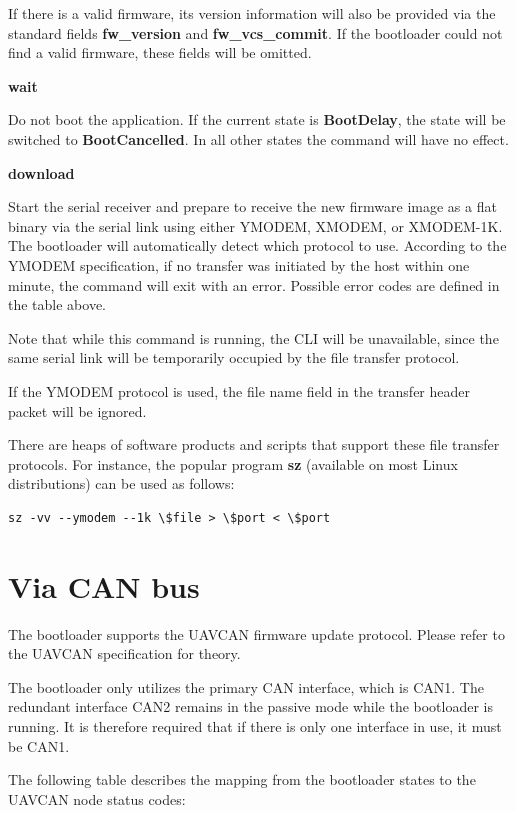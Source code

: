 \documentclass{zubaxdoc}
\begin{document}
If there is a valid firmware, its version information will also be provided via the standard fields \textbf{fw{\_}version} and  \textbf{fw{\_}vcs{\_}commit}. If the bootloader could not find a valid firmware, these fields will be omitted.

\textbf{wait}

Do not boot the application. If the current state is \textbf{BootDelay}, the state will be switched to \textbf{BootCancelled}. In all other states the command will have no effect.

\textbf{download}

Start the serial receiver and prepare to receive the new firmware image as a flat binary via the serial link using either YMODEM, XMODEM, or XMODEM-1K. The bootloader will automatically detect which protocol to use. According to the YMODEM specification, if no transfer was initiated by the host within one minute, the command will exit with an error. Possible error codes are defined in the table above.

Note that while this command is running, the CLI will be unavailable, since the same serial link will be temporarily occupied by the file transfer protocol.

If the YMODEM protocol is used, the file name field in the transfer header packet will be ignored.

There are heaps of software products and scripts that support these file transfer protocols. For instance, the popular program \textbf{sz} (available on most Linux distributions) can be used as follows:
\begin{verbatim}
sz -vv --ymodem --1k \$file > \$port < \$port
\end{verbatim}

\section{Via CAN bus}

The bootloader supports the UAVCAN firmware update protocol. Please refer to the UAVCAN specification for theory.

The bootloader only utilizes the primary CAN interface, which is CAN1. The redundant interface CAN2 remains in the passive mode while the bootloader is running. It is therefore required that if there is only one interface in use, it must be CAN1.

The following table describes the mapping from the bootloader states to the UAVCAN node status codes:
\end{document}
